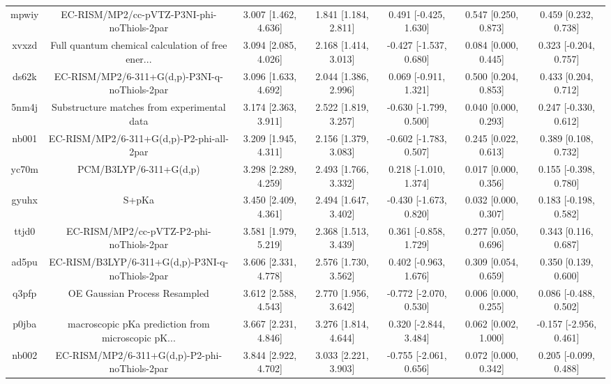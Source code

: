 \documentclass{article}
\begin{document}
\begin{center}
\begin{longtable}{|ccccccc|}
 mpwiy &         EC-RISM/MP2/cc-pVTZ-P3NI-phi-noThiols-2par &  3.007 [1.462, 4.636] &  1.841 [1.184, 2.811] &    0.491 [-0.425, 1.630] &  0.547 [0.250, 0.873] &    0.459 [0.232, 0.738] \\
 xvxzd &  Full quantum chemical calculation of free ener... &  3.094 [2.085, 4.026] &  2.168 [1.414, 3.013] &   -0.427 [-1.537, 0.680] &  0.084 [0.000, 0.445] &   0.323 [-0.204, 0.757] \\
 ds62k &      EC-RISM/MP2/6-311+G(d,p)-P3NI-q-noThiols-2par &  3.096 [1.633, 4.692] &  2.044 [1.386, 2.996] &    0.069 [-0.911, 1.321] &  0.500 [0.204, 0.853] &    0.433 [0.204, 0.712] \\
 5nm4j &        Substructure matches from experimental data &  3.174 [2.363, 3.911] &  2.522 [1.819, 3.257] &   -0.630 [-1.799, 0.500] &  0.040 [0.000, 0.293] &   0.247 [-0.330, 0.612] \\
 nb001 &           EC-RISM/MP2/6-311+G(d,p)-P2-phi-all-2par &  3.209 [1.945, 4.311] &  2.156 [1.379, 3.083] &   -0.602 [-1.783, 0.507] &  0.245 [0.022, 0.613] &    0.389 [0.108, 0.732] \\
 yc70m &                             PCM/B3LYP/6-311+G(d,p) &  3.298 [2.289, 4.259] &  2.493 [1.766, 3.332] &    0.218 [-1.010, 1.374] &  0.017 [0.000, 0.356] &   0.155 [-0.398, 0.780] \\
 gyuhx &                                              S+pKa &  3.450 [2.409, 4.361] &  2.494 [1.647, 3.402] &   -0.430 [-1.673, 0.820] &  0.032 [0.000, 0.307] &   0.183 [-0.198, 0.582] \\
 ttjd0 &           EC-RISM/MP2/cc-pVTZ-P2-phi-noThiols-2par &  3.581 [1.979, 5.219] &  2.368 [1.513, 3.439] &    0.361 [-0.858, 1.729] &  0.277 [0.050, 0.696] &    0.343 [0.116, 0.687] \\
 ad5pu &    EC-RISM/B3LYP/6-311+G(d,p)-P3NI-q-noThiols-2par &  3.606 [2.331, 4.778] &  2.576 [1.730, 3.562] &    0.402 [-0.963, 1.676] &  0.309 [0.054, 0.659] &    0.350 [0.139, 0.600] \\
 q3pfp &                      OE Gaussian Process Resampled &  3.612 [2.588, 4.543] &  2.770 [1.956, 3.642] &   -0.772 [-2.070, 0.530] &  0.006 [0.000, 0.255] &   0.086 [-0.488, 0.502] \\
 p0jba &  macroscopic pKa prediction from microscopic pK... &  3.667 [2.231, 4.846] &  3.276 [1.814, 4.644] &    0.320 [-2.844, 3.484] &  0.062 [0.002, 1.000] &  -0.157 [-2.956, 0.461] \\
 nb002 &      EC-RISM/MP2/6-311+G(d,p)-P2-phi-noThiols-2par &  3.844 [2.922, 4.702] &  3.033 [2.221, 3.903] &   -0.755 [-2.061, 0.656] &  0.072 [0.000, 0.342] &   0.205 [-0.099, 0.488] \\

\end{longtable}
\end{center}
\end{document}
